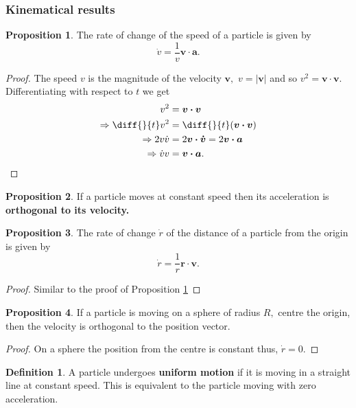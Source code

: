 \documentclass[12pt, a4paper]{article}
\newcommand{\f}[2]{\frac{#1}{#2}}
\newcommand{\imply}{\Rightarrow}
\theoremstyle{definition}
\newtheorem{definition}{Definition}[section]
\newtheorem{proposition}{Proposition}
\theoremstyle{plain}
\begin{document}
\subsubsection{Kinematical results}

\begin{proposition}\label{prop:Change of speed}
The rate of change of the speed of a particle is given by $$\dot{v}=\f{1}{v}\bm{v\cdot a}.$$
\end{proposition}

\begin{proof}
The speed $v$ is the magnitude of the velocity $\bm{v},$ $v = |\bm{v}|$ and so $v^2 = \bm{v \cdot v}.$ Differentiating with respect to $t$ we get $$\begin{aligned}
v^2&=\bm{v\cdot v} \\
\imply \diff{}{t}v^2&=\diff{}{t}(\bm{v\cdot v}) \\
\imply 2v\dot{v}&=2\bm{v\cdot \dot{v}} =2\bm{v\cdot a} \\
\imply \dot{v}v&=\bm{v\cdot a}.
\end{aligned}$$
\end{proof}

\begin{proposition}
If a particle moves at constant speed then its acceleration is \textbf{orthogonal to its velocity.}
\end{proposition}

\begin{proposition}
The rate of change $\dot{r}$ of the distance of a particle from the origin is given by $$\dot{r}=\f{1}{r}\bm{r\cdot v}.$$
\end{proposition}

\begin{proof}
Similar to the proof of Proposition \ref{prop:Change of speed}
\end{proof}

\begin{proposition}
If a particle is moving on a sphere of radius $R,$ centre the origin, then the velocity is orthogonal to the position vector.
\end{proposition}

\begin{proof}
On a sphere the position from the centre is constant thus, $\dot{r}=0.$
\end{proof}

\begin{definition}
A particle undergoes \textbf{uniform motion} if it is moving in a straight line at constant speed. This is equivalent to the particle moving with zero acceleration.
\end{definition}
\end{document}
